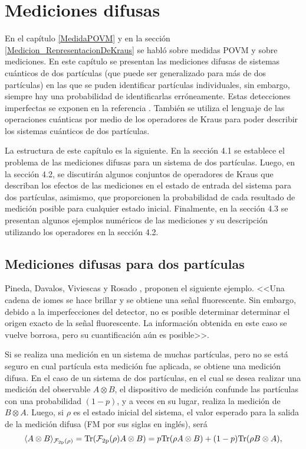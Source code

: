 \chapter{Mediciones difusas}


En el capítulo {\ref{MedidaPOVM}} y en la sección {\ref{Medicion_RepresentacionDeKraus}} se habló sobre medidas POVM y sobre mediciones. En este capítulo se presentan las mediciones difusas de sistemas cuánticos de dos partículas (que puede ser generalizado para más de dos partículas) en las que se puden identificar partículas individuales, sin embargo, siempre hay una probabilidad de identificarlas erróneamente. Estas detecciones imperfectas se exponen en la referencia {\cite{Pineda_2021}}. También se utiliza el lenguaje de las operaciones cuánticas por medio de los operadores de Kraus para poder describir los sistemas cuánticos de dos partículas.

La estructura de este capítulo es la siguiente. En la sección 4.1 se establece el problema de las mediciones difusas para un sistema de dos partículas. Luego, en la sección 4.2, se discutirán algunos conjuntos de operadores de Kraus que describan los efectos de las mediciones en el estado de entrada del sistema para dos partículas, asimismo, que proporcionen la probabilidad de cada resultado de medición posible para cualquier estado inicial. Finalmente, en la sección 4.3 se presentan algunos ejemplos numéricos de las mediciones y su descripción utilizando los operadores en la sección 4.2.



\section{Mediciones difusas para dos partículas}

Pineda, Davalos, Viviescas y Rosado {\cite{Pineda_2021}}, proponen el siguiente ejemplo. <<Una cadena de iomes se hace brillar  y se obtiene una señal fluorescente. Sin embargo, debido a la imperfecciones del detector, no es posible determinar
determinar el origen exacto de la señal fluorescente. La información obtenida en este caso se vuelve borrosa, pero su cuantificación aún es posible>>.

Si se  realiza una  medición en un sistema de muchas partículas, pero no se está seguro en cual partícula esta medición fue aplicada, se obtiene una medición difusa. En el caso de un sistema de dos partículas, en el cual se desea realizar una medición del observable $A\otimes B$, el dispositivo de medición confunde las partículas con una probabilidad $(1-p)$, y a veces en su lugar, realiza la medición de $B\otimes A$. Luego, si $\rho$ es el estado inicial del sistema, el valor esperado para la salida de la medición difusa (FM por sus siglas en inglés), será 
\begin{equation}
    \langle A\otimes B\rangle_{\mathcal{F_{\text{2p}}(\rho)}}={\rm Tr}(\mathcal{F_{\text{2p}}(\rho)}A\otimes B)=p{\rm Tr}(\rho A\otimes B)+(1-p){\rm Tr}(\rho B\otimes A),
\end{equation}



